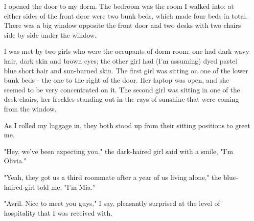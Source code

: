 I opened the door to my dorm. The bedroom was the room I walked into: at either sides of the front door were two bunk beds, which made four beds in total. There was a big window opposite the front door and two desks with two chairs side by side under the window.

I was met by two girls who were the occupants of dorm room: one had dark wavy hair, dark skin and brown eyes; the other girl had (I'm assuming) dyed pastel blue short hair and sun-burned skin. The first girl was sitting on one of the lower bunk beds - the one to the right of the door.  Her laptop was open, and she seemed to be very concentrated on it. The second girl was sitting in one of the desk chairs, her freckles standing out in the rays of sunshine that were coming from the window.

As I rolled my luggage in, they both stood up from their sitting positions to greet me.

"Hey, we've been expecting you," the dark-haired girl said with a smile, "I'm Olivia."

"Yeah, they got us a third roommate after a year of us living alone," the blue-haired girl told me, "I'm Mia."

"Avril. Nice to meet you guys," I say, pleasantly surprised at the level of hospitality that I was received with.

